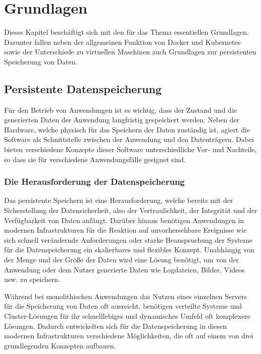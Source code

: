 \chapter{Grundlagen}
\label{cha:grundlagen}

Dieses Kapitel beschäftigt sich mit den für das Thema essentiellen Grundlagen. Darunter fallen neben der allgemeinen Funktion von Docker und Kubernetes sowie der Unterschiede zu virtuellen Maschinen auch Grundlagen zur persistenten Speicherung von Daten.

\section{Persistente Datenspeicherung}
\label{sec:persitenz}
Für den Betrieb von Anwendungen ist es wichtig, dass der Zustand und die generierten Daten der Anwendung langfristig gespeichert werden. Neben der Hardware, welche physisch für das Speichern der Daten zuständig ist, agiert die Software als Schnittstelle zwischen der Anwendung und den Datenträgern. Dabei bieten verschiedene Konzepte dieser Software unterschiedliche Vor- und Nachteile, so dass sie für verschiedene Anwendungsfälle geeignet sind.


\subsection{Die Herausforderung der Datenspeicherung}
Das persistente Speichern ist eine Herausforderung, welche bereits mit der Sicherstellung der Datensicherheit, also der Vertraulichkeit, der Integrität und der Verfügbarkeit von Daten anfängt. Darüber hinaus benötigen Anwendungen in modernen Infrastrukturen für die Reaktion auf unvorhersehbare Ereignisse wie sich schnell verändernde Anforderungen oder starke Beanspruchung der Systeme für die Datenspeicherung ein skalierbares und flexibles Konzept. Unabhängig von der Menge und der Größe der Daten wird eine Lösung benötigt, um von der Anwendung oder dem Nutzer generierte Daten wie Logdateien, Bilder, Videos usw. zu speichern. \medskip

Während bei monolithischen Anwendungen das Nutzen eines einzelnen Servers für die Speicherung von Daten oft ausreicht, benötigen verteilte Systeme und Cluster-Lösungen für ihr schnelllebiges und dynamisches Umfeld oft komplexere Lösungen. Dadurch entwickelten sich für die Datenspeicherung in diesen modernen Infrastrukturen verschiedene Möglichkeiten, die oft auf einem von drei grundlegenden Konzepten aufbauen.


